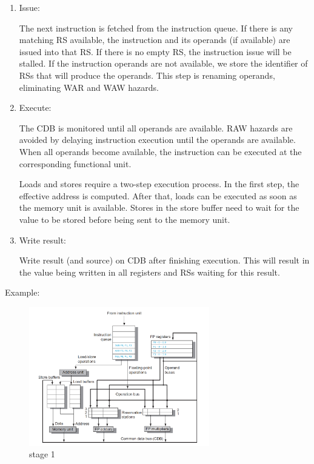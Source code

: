 \documentclass[12pt]{article}
\begin{document}
\begin{enumerate}
	\item Issue:
	
	The next instruction is fetched from the instruction queue. If there is any matching RS available, the instruction and its operands  (if available) are issued into that RS. If there is no empty RS, the instruction issue will be stalled.
	If the instruction operands are not available, we store the identifier of RSs that will produce the operands. This step is renaming operands, eliminating WAR and WAW hazards.
	
	\item Execute:
	
	The CDB is monitored until all operands are available. RAW hazards are avoided by delaying instruction execution until the operands are available. When all operands become available, the instruction can be executed at the corresponding functional unit.
	
	Loads and stores require a two-step execution process. In the first step, the effective address is computed. After that, loads can be executed as soon as the memory unit is available. Stores in the store buffer need to wait for the value to be stored before being sent to the memory unit.
	
	\item Write result:
	
	Write result (and source) on CDB after finishing execution. This will result in the value being written in all registers and RSs waiting for this result.
	
\end{enumerate}


Example:

\begin{figure}[H]
	\centering
	\includegraphics[width=0.7\textwidth]{./images/tomas/e1.png}	
	\cprotect\caption{stage 1}
	\label{fig:tom2}
\end{figure}
\end{document}
